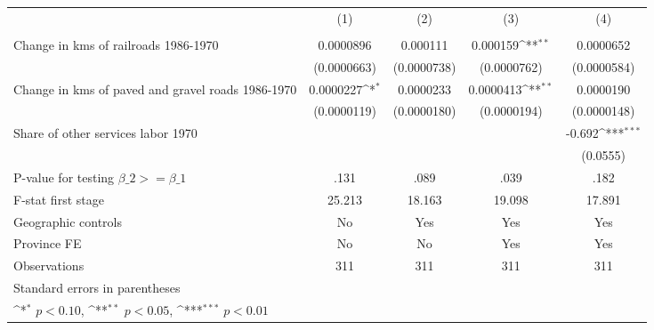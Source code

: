 {
\def\sym#1{\ifmmode^{#1}\else\(^{#1}\)\fi}
\begin{tabular}{l*{4}{c}}
\hline\hline
                &\multicolumn{1}{c}{(1)}&\multicolumn{1}{c}{(2)}&\multicolumn{1}{c}{(3)}&\multicolumn{1}{c}{(4)}\\
                &\multicolumn{1}{c}{}&\multicolumn{1}{c}{}&\multicolumn{1}{c}{}&\multicolumn{1}{c}{}\\
\hline
Change in kms of railroads 1986-1970&0.0000896         & 0.000111         & 0.000159\sym{**} &0.0000652         \\
                &(0.0000663)         &(0.0000738)         &(0.0000762)         &(0.0000584)         \\
[1em]
Change in kms of paved and gravel roads 1986-1970&0.0000227\sym{*}  &0.0000233         &0.0000413\sym{**} &0.0000190         \\
                &(0.0000119)         &(0.0000180)         &(0.0000194)         &(0.0000148)         \\
[1em]
Share of other services labor 1970&                  &                  &                  &   -0.692\sym{***}\\
                &                  &                  &                  & (0.0555)         \\
\hline
P-value for testing $\beta\_{2} >= \beta\_{1}$&     .131         &     .089         &     .039         &     .182         \\
F-stat first stage&   25.213         &   18.163         &   19.098         &   17.891         \\
Geographic controls&       No         &      Yes         &      Yes         &      Yes         \\
Province FE     &       No         &       No         &      Yes         &      Yes         \\
Observations    &      311         &      311         &      311         &      311         \\
\hline\hline
\multicolumn{5}{l}{\footnotesize Standard errors in parentheses}\\
\multicolumn{5}{l}{\footnotesize \sym{*} \(p<0.10\), \sym{**} \(p<0.05\), \sym{***} \(p<0.01\)}\\
\end{tabular}
}
